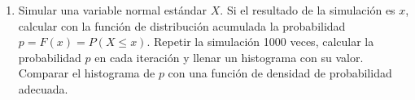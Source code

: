 \documentclass[a4paper,11pt]{article}
\begin{document}
\begin{enumerate}
\item Simular una variable normal estándar $X$. Si el resultado de la simulación es $x$, calcular con la función de distribución acumulada la probabilidad $p = F(x) = P(X \le x)$. Repetir la simulación 1000 veces, calcular la probabilidad $p$ en cada iteración y llenar un histograma con su valor. Comparar el histograma de $p$ con una función de densidad de probabilidad adecuada.  








\end{enumerate}
\end{document}
